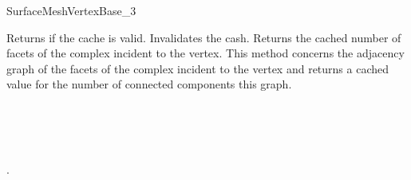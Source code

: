 \begin{ccRefConcept}{SurfaceMeshVertexBase_3}
\ccCreation
{}  %


\ccOperations


{Returns  if the cache is valid.}
\ccGlue
{}
{Invalidates the cash.}
\ccGlue
{}
{Returns the cached number of facets of the complex incident to the vertex.}
\ccGlue
{}
{ This method concerns the adjacency
graph of  the facets of the complex incident to the vertex
and returns a cached value for the number of connected components this graph.}

\ccHasModels

 \\


\ccSeeAlso

 \\
 \\
.





\end{ccRefConcept}



